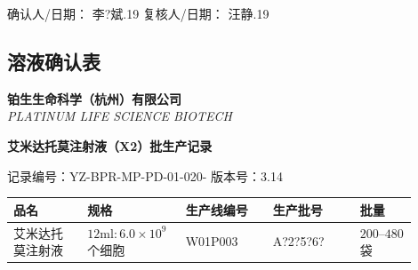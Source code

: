 \documentclass[UTF8,10pt,a4paper,fontset=fandol]{ctexart}
\newcommand{\fieldvalue}[1]{#1}
\newcommand{\handwritten}[1]{#1}
\begin{document}
\noindent
确认人/日期：
\fieldvalue{\handwritten{李?斌.19}}
\hfill
复核人/日期：
\fieldvalue{\handwritten{汪静.19}}

\subsection{溶液确认表}

\newpage

\noindent
\textbf{铂生生命科学（杭州）有限公司}\\
\textit{PLATINUM LIFE SCIENCE BIOTECH}

\begin{center}
\textbf{艾米达托莫注射液（X2）批生产记录}
\end{center}

\noindent
记录编号：YZ-BPR-MP-PD-01-020- \hfill 版本号：3.14

\begin{center}
\begin{tabular}{|p{0.17\linewidth}|p{0.20\linewidth}|p{0.20\linewidth}|p{0.20\linewidth}|p{0.13\linewidth}|}
\hline
品名 & 规格 & 生产线编号 & 生产批号 & 批量\\
\hline
艾米达托莫注射液 & $12\mathrm{ml}: 6.0\times10^{9}$个细胞 &
\fieldvalue{\handwritten{W01P003}} &
\fieldvalue{\handwritten{A?2?5?6?}} &
$200$--$480$袋\\
\hline
\end{tabular}
\end{center}
\end{document}
